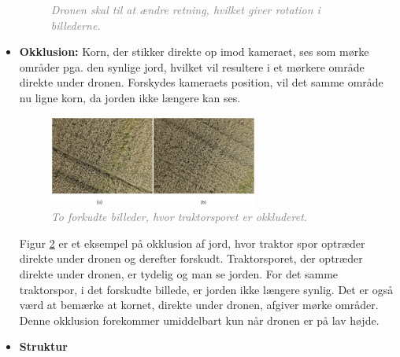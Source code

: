 \begin{itemize}
{\begin{figure}[H]
     \vspace{-1em}
    \begin{center} 
       \caption{\textcolor{gray}{\footnotesize \textit{Dronen skal til at ændre retning, hvilket giver rotation i billederne.}}}
    \label{fig:rotation}
     \end{center}
     \vspace{-2.5em}
  \end{figure} \noindent}
\item{\textbf{Okklusion:}
Korn, der stikker direkte op imod kameraet, ses som mørke områder pga. den synlige jord, hvilket vil resultere i et mørkere område direkte under dronen. Forskydes kameraets position, vil det samme område nu ligne korn, da jorden ikke længere kan ses. 
\begin{figure}[H]
    \centering
    \includegraphics[width=0.65\textwidth]{fig/18.png}
     \vspace{-1em}
    \begin{center}    
       \caption{\textcolor{gray}{\footnotesize \textit{ To forkudte billeder, hvor traktorsporet er okkluderet. }}}
    \label{fig:okklusion}
     \end{center}
     \vspace{-2.5em}
  \end{figure} \noindent
Figur \ref{fig:okklusion} er et eksempel på okklusion af jord, hvor traktor spor optræder direkte under dronen og derefter forskudt. Traktorsporet, der optræder direkte under dronen, er tydelig og man se jorden. For det samme traktorspor, i det forskudte billede, er jorden ikke længere synlig. Det er også værd at bemærke at kornet, direkte under dronen, afgiver mørke områder. Denne okklusion forekommer umiddelbart kun når dronen er på lav højde.}
\item{\textbf{Struktur} }
\end{itemize}
